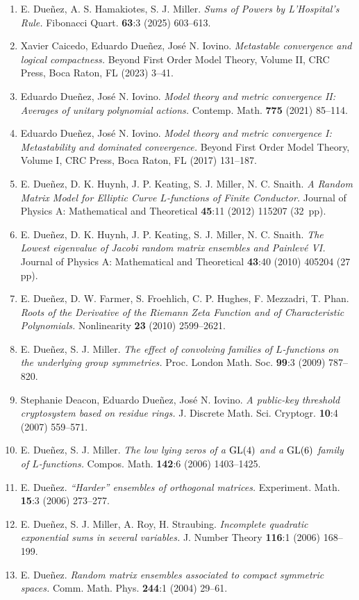 \documentclass[11pt,a4paper,ragged2e,withhyper]{altacv}
\begin{document}
\begin{enumerate}
\item E. Due{\~n}ez, A. S. Hamakiotes, S. J. Miller. \emph{Sums of Powers by {L}'{H}ospital's Rule.} Fibonacci Quart. \textbf{63}:3 (2025) 603--613.
\item Xavier Caicedo, Eduardo Due\~{n}ez, Jos{\'e} N. Iovino. \emph{Metastable convergence and logical compactness.} Beyond First Order Model Theory, Volume II, CRC Press, Boca Raton, FL (2023) 3--41.
\item Eduardo Due\~{n}ez, Jos\'{e} N. Iovino. \emph{Model theory and metric convergence {II}: {A}verages of unitary polynomial actions.} Contemp. Math. \textbf{775} (2021) 85--114.
\item Eduardo Due\~{n}ez, Jos\'{e} N. Iovino. \emph{Model theory and metric convergence {I}: {M}etastability and dominated convergence.} Beyond First Order Model Theory, Volume I, CRC Press, Boca Raton, FL (2017) 131--187.
\item E. Due{\~n}ez, D. K. Huynh, J. P. Keating, S. J. Miller, N. C. Snaith. \emph{A Random Matrix Model for Elliptic Curve {$L$}-functions of Finite Conductor.} Journal of Physics A: Mathematical and Theoretical \textbf{45}:11 (2012) 115207 (32~pp).
\item E. Due{\~n}ez, D. K. Huynh, J. P. Keating, S. J. Miller, N. C. Snaith. \emph{The Lowest eigenvalue of {J}acobi random matrix ensembles and {P}ainlev{\'e} {VI}.} Journal of Physics A: Mathematical and Theoretical \textbf{43}:40 (2010) 405204 (27 pp).
\item E. Due{\~n}ez, D. W. Farmer, S. Froehlich, C. P. Hughes, F. Mezzadri, T. Phan. \emph{Roots of the Derivative of the {R}iemann Zeta Function and of Characteristic Polynomials.} Nonlinearity \textbf{23} (2010) 2599--2621.
\item E. Due{\~n}ez, S. J. Miller. \emph{The effect of convolving families of {$L$}-functions on the underlying group symmetries.} Proc. London Math. Soc. \textbf{99}:3 (2009) 787--820.
\item Stephanie Deacon, Eduardo Due{\~n}ez, Jos{\'e} N. Iovino. \emph{A public-key threshold cryptosystem based on residue rings.} J. Discrete Math. Sci. Cryptogr. \textbf{10}:4 (2007) 559--571.
\item E. Due{\~n}ez, S. J. Miller. \emph{The low lying zeros of a {$\rm GL(4)$} and a {$\rm GL(6)$} family of {$L$}-functions.} Compos. Math. \textbf{142}:6 (2006) 1403--1425.
\item E. Due{\~n}ez. \emph{``{H}arder'' ensembles of orthogonal matrices.} Experiment. Math. \textbf{15}:3 (2006) 273--277.
\item E. Due{\~n}ez, S. J. Miller, A. Roy, H. Straubing. \emph{Incomplete quadratic exponential sums in several variables.} J. Number Theory \textbf{116}:1 (2006) 168--199.
\item E. Due{\~n}ez. \emph{Random matrix ensembles associated to compact symmetric spaces.} Comm. Math. Phys. \textbf{244}:1 (2004) 29--61.
\end{enumerate}
\end{document}
